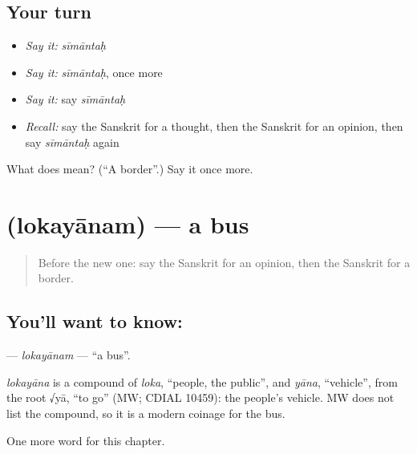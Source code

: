 \subsection*{Your turn}
\begin{itemize}
\raggedright
  \item \emph{Say it:} \emph{sīmāntaḥ}
  \item \emph{Say it:} \emph{sīmāntaḥ}, once more
  \item \emph{Say it:} say \emph{sīmāntaḥ}
  \item \emph{Recall:} say the Sanskrit for a thought, then the Sanskrit for an opinion, then say \emph{sīmāntaḥ} again
\end{itemize}

\begin{tcolorbox}[breakable,colback=teal!4,colframe=teal!35!black,title={Before you move on}]
What does  mean? (\textquotedblleft{}A border\textquotedblright{}.) Say it once more.
\end{tcolorbox}
\section[\texorpdfstring{\sk{लोकयानम्} (lokayānam)}{लोकयानम् (lokayānam)}]{ (lokayānam) — a bus}

\label{lesson:SA-C257-lokayanam}



\begin{quote}
Before the new one: say the Sanskrit for an opinion, then the Sanskrit for a border.
\end{quote}

\subsection*{You'll want to know: }
\textbf{} — \emph{lokayānam} — \textquotedblleft{}a bus\textquotedblright{}.

\begin{cousinweb}
\emph{lokayāna} is a compound of \emph{loka}, \textquotedblleft{}people, the public\textquotedblright{}, and \emph{yāna}, \textquotedblleft{}vehicle\textquotedblright{}, from the root √yā, \textquotedblleft{}to go\textquotedblright{} (MW; CDIAL 10459): the people's vehicle. MW does not list the compound, so it is a modern coinage for the bus.
\end{cousinweb}

\begin{grammarlens}[title={What you've built}]
One more word for this chapter.
\end{grammarlens}

